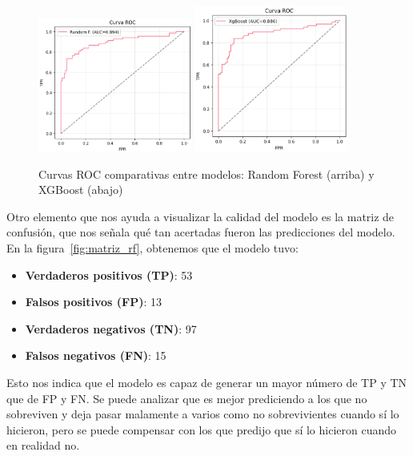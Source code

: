 \documentclass[conference]{IEEEtran}
\begin{document}
\begin{figure}[htbp]
\centering
\includegraphics[width=0.45\textwidth]{figures/ROC_RF.png}
\includegraphics[width=0.45\textwidth]{figures/ROC_XG.png}
\caption{Curvas ROC comparativas entre modelos: Random Forest (arriba) y XGBoost (abajo)}
\label{fig:roc_comparativa}
\end{figure} 

Otro elemento que nos ayuda a visualizar la calidad del modelo es la matriz de confusión, que nos señala qué tan acertadas fueron las predicciones del modelo. En la figura~\ref{fig:matriz_rf}, obtenemos que el modelo tuvo:

\begin{itemize}
    \item \textbf{Verdaderos positivos (TP)}: 53
    \item \textbf{Falsos positivos (FP)}: 13
    \item \textbf{Verdaderos negativos (TN)}: 97
    \item \textbf{Falsos negativos (FN)}: 15
\end{itemize}

Esto nos indica que el modelo es capaz de generar un mayor número de TP y TN que de FP y FN. Se puede analizar que es mejor prediciendo a los que no sobreviven y deja pasar malamente a varios como no sobrevivientes cuando sí lo hicieron, pero se puede compensar con los que predijo que sí lo hicieron cuando en realidad no.
\end{document}
